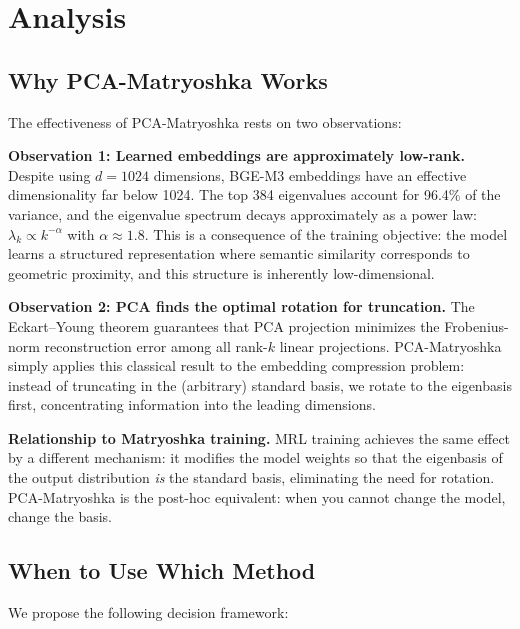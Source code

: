\documentclass[journal]{IEEEtran}
\begin{document}
\section{Analysis}
\label{sec:analysis}

\subsection{Why PCA-Matryoshka Works}

The effectiveness of PCA-Matryoshka rests on two observations:

\textbf{Observation 1: Learned embeddings are approximately low-rank.}
Despite using $d = 1024$ dimensions, BGE-M3 embeddings have an effective dimensionality far below 1024.
The top 384 eigenvalues account for 96.4\% of the variance, and the eigenvalue spectrum decays approximately as a power law: $\lambda_k \propto k^{-\alpha}$ with $\alpha \approx 1.8$.
This is a consequence of the training objective: the model learns a structured representation where semantic similarity corresponds to geometric proximity, and this structure is inherently low-dimensional.

\textbf{Observation 2: PCA finds the optimal rotation for truncation.}
The Eckart--Young theorem guarantees that PCA projection minimizes the Frobenius-norm reconstruction error among all rank-$k$ linear projections.
PCA-Matryoshka simply applies this classical result to the embedding compression problem: instead of truncating in the (arbitrary) standard basis, we rotate to the eigenbasis first, concentrating information into the leading dimensions.

\textbf{Relationship to Matryoshka training.}
MRL training achieves the same effect by a different mechanism: it modifies the model weights so that the eigenbasis of the output distribution \emph{is} the standard basis, eliminating the need for rotation.
PCA-Matryoshka is the post-hoc equivalent: when you cannot change the model, change the basis.

\subsection{When to Use Which Method}

We propose the following decision framework:
\end{document}
